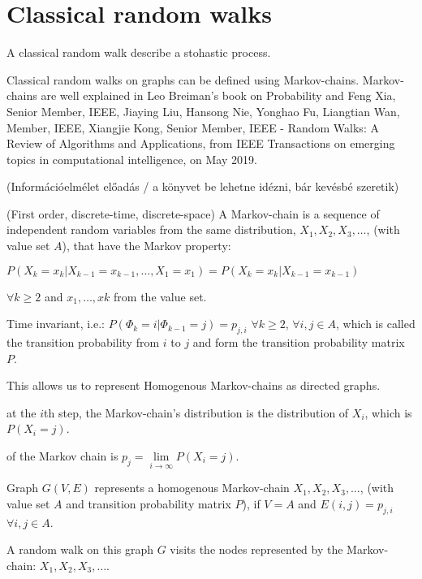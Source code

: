 \section{Classical random walks}

A classical random walk describe a stohastic process.


Classical random walks on graphs can be defined using Markov-chains. Markov-chains
are well explained in Leo Breiman's book on Probability\cite{breiman_probability_1992} and Feng Xia, Senior Member, IEEE, Jiaying Liu, Hansong Nie, Yonghao Fu, Liangtian Wan, Member, IEEE,
Xiangjie Kong, Senior Member, IEEE - Random Walks: A Review of Algorithms and Applications, from IEEE Transactions on emerging topics in computational intelligence, on May 2019.

(Információelmélet előadás / a könyvet be lehetne idézni, bár kevésbé szeretik)

 (First order, discrete-time, discrete-space) A Markov-chain is a sequence of independent random variables from the same distribution, $X_1, X_2, X_3, \dots$, (with value set $A$), that have the Markov property:


$P(X_k = x_k | X_{k-1} = x_{k-1}, \dots, X_1 = x_1) = P(X_k = x_k | X_{k-1} = x_{k-1})$

$\forall k\geq{}2$ and $x_{1},\dots, x{k}$ from the value set.

 Time invariant, i.e.:
$P(\Phi_k = i | \Phi_{k-1} = j) = p_{j,i}$ $\forall k\geq{}2$, $\forall i,j \in{} A$, which is called the transition probability from $i$ to $j$ and form the transition probability matrix $P$.

This allows us to represent Homogenous Markov-chains as directed graphs.

 at the $i$th step, the Markov-chain's distribution is the distribution of $X_i$, which is $P(X_i = j)$.

 of the Markov chain is $p_{j} = \lim\limits_{i \to \infty} P(X_i = j)$.

Graph $G(V,E)$ represents a homogenous Markov-chain $X_1, X_2, X_3, \dots$, (with value set $A$ and transition probability matrix $P$), if $V=A$ and $E(i,j) = p_{j,i}$ $\forall{}i,j\in{}A$.

A random walk on this graph $G$ visits the nodes represented by the Markov-chain: $X_1, X_2, X_3, \dots$.
